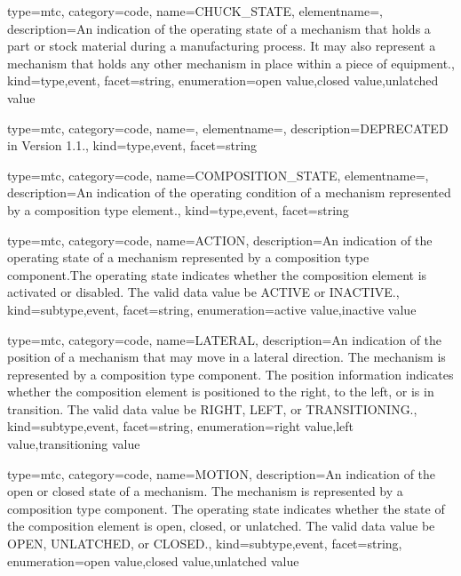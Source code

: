 {
  type=mtc,
  category=code,
  name={CHUCK\_STATE},
  elementname=,
  description={An indication of the operating state of a mechanism that holds a part or stock material during a manufacturing process. It may also represent a mechanism that holds any other mechanism in place within a piece of equipment.},
  kind={type,event},
  facet={\gls{string}},
  enumeration={\gls{open value},\gls{closed value},\gls{unlatched value}}
}


{
  type=mtc,
  category=code,
  name=,
  elementname=,
  description={DEPRECATED in Version 1.1.},
  kind={type,event},
  facet={\gls{string}}
}


{
  type=mtc,
  category=code,
  name={COMPOSITION\_STATE},
  elementname=,
  description={An indication of the operating condition of a mechanism represented by a \gls{composition} type element.},
  kind={type,event},
  facet={\gls{string}}
}


{
  type=mtc,
  category=code,
  name={ACTION},
  description={An indication of the operating state of a mechanism represented by a \gls{composition} type component.The operating state indicates whether the \gls{composition} element is activated or disabled. The \gls{valid data value} \must be ACTIVE or INACTIVE.},
  kind={subtype,event},
  facet={\gls{string}},
  enumeration={\gls{active value},\gls{inactive value}}
}


{
  type=mtc,
  category=code,
  name={LATERAL},
  description={An indication of the position of a mechanism that may move in a lateral direction.   The mechanism is represented by a \gls{composition} type component. \newline The position information indicates whether the \gls{composition} element is positioned to the right, to the left, or is in transition.  \newline The \gls{valid data value} \must be RIGHT, LEFT, or TRANSITIONING.},
  kind={subtype,event},
  facet={\gls{string}},
  enumeration={\gls{right value},\gls{left value},\gls{transitioning value}}
}


{
  type=mtc,
  category=code,
  name={MOTION},
  description={An indication of the open or closed state of a mechanism.   The mechanism is represented by a \gls{composition} type component. \newline The operating state indicates whether the state of the \gls{composition} element is open, closed, or unlatched.   \newline The \gls{valid data value} \must be OPEN, UNLATCHED, or CLOSED.},
  kind={subtype,event},
  facet={\gls{string}},
  enumeration={\gls{open value},\gls{closed value},\gls{unlatched value}}
}


